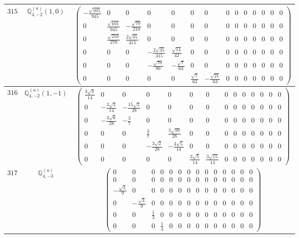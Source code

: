 \documentclass[fleqn,8pt,landscape]{jsarticle}
\begin{document}
\begin{center}
\begin{longtable}{ccc}
$ 315 $ & $ \mathbb{Q}_{4,-2}^{(a)}(1,0) $ & $ \begin{pmatrix} - \frac{\sqrt{105}}{945} & 0 & 0 & 0 & 0 & 0 & 0 & 0 & 0 & 0 & 0 & 0 & 0 & 0 \\ 0 & \frac{\sqrt{105}}{945} & - \frac{\sqrt{70}}{210} & 0 & 0 & 0 & 0 & 0 & 0 & 0 & 0 & 0 & 0 & 0 \\ 0 & \frac{\sqrt{210}}{270} & \frac{2 \sqrt{35}}{315} & 0 & 0 & 0 & 0 & 0 & 0 & 0 & 0 & 0 & 0 & 0 \\ 0 & 0 & 0 & - \frac{2 \sqrt{35}}{315} & \frac{\sqrt{14}}{42} & 0 & 0 & 0 & 0 & 0 & 0 & 0 & 0 & 0 \\ 0 & 0 & 0 & - \frac{\sqrt{70}}{90} & - \frac{\sqrt{7}}{63} & 0 & 0 & 0 & 0 & 0 & 0 & 0 & 0 & 0 \\ 0 & 0 & 0 & 0 & 0 & \frac{\sqrt{7}}{63} & - \frac{\sqrt{21}}{63} & 0 & 0 & 0 & 0 & 0 & 0 & 0 \end{pmatrix} $ \\ \hline
$ 316 $ & $ \mathbb{Q}_{4,-2}^{(a)}(1,-1) $ & $ \begin{pmatrix} \frac{3 \sqrt{3}}{14} & 0 & 0 & 0 & 0 & 0 & 0 & 0 & 0 & 0 & 0 & 0 & 0 & 0 \\ 0 & - \frac{3 \sqrt{3}}{14} & - \frac{15 \sqrt{2}}{28} & 0 & 0 & 0 & 0 & 0 & 0 & 0 & 0 & 0 & 0 & 0 \\ 0 & - \frac{3 \sqrt{6}}{28} & - \frac{3}{7} & 0 & 0 & 0 & 0 & 0 & 0 & 0 & 0 & 0 & 0 & 0 \\ 0 & 0 & 0 & \frac{3}{7} & \frac{3 \sqrt{10}}{28} & 0 & 0 & 0 & 0 & 0 & 0 & 0 & 0 & 0 \\ 0 & 0 & 0 & - \frac{3 \sqrt{2}}{28} & - \frac{3 \sqrt{5}}{14} & 0 & 0 & 0 & 0 & 0 & 0 & 0 & 0 & 0 \\ 0 & 0 & 0 & 0 & 0 & \frac{3 \sqrt{5}}{14} & \frac{3 \sqrt{15}}{14} & 0 & 0 & 0 & 0 & 0 & 0 & 0 \end{pmatrix} $ \\ \hline
$ 317 $ & $ \mathbb{Q}_{4,-3}^{(a)} $ & $ \begin{pmatrix} 0 & 0 & 0 & 0 & 0 & 0 & 0 & 0 & 0 & 0 & 0 & 0 & 0 & 0 \\ 0 & 0 & 0 & 0 & 0 & 0 & 0 & 0 & 0 & 0 & 0 & 0 & 0 & 0 \\ - \frac{\sqrt{3}}{9} & 0 & 0 & 0 & 0 & 0 & 0 & 0 & 0 & 0 & 0 & 0 & 0 & 0 \\ 0 & - \frac{\sqrt{3}}{9} & 0 & 0 & 0 & 0 & 0 & 0 & 0 & 0 & 0 & 0 & 0 & 0 \\ 0 & 0 & \frac{1}{3} & 0 & 0 & 0 & 0 & 0 & 0 & 0 & 0 & 0 & 0 & 0 \\ 0 & 0 & 0 & \frac{1}{3} & 0 & 0 & 0 & 0 & 0 & 0 & 0 & 0 & 0 & 0 \end{pmatrix} $ \\ \hline

\end{longtable}
\end{center}
\end{document}
